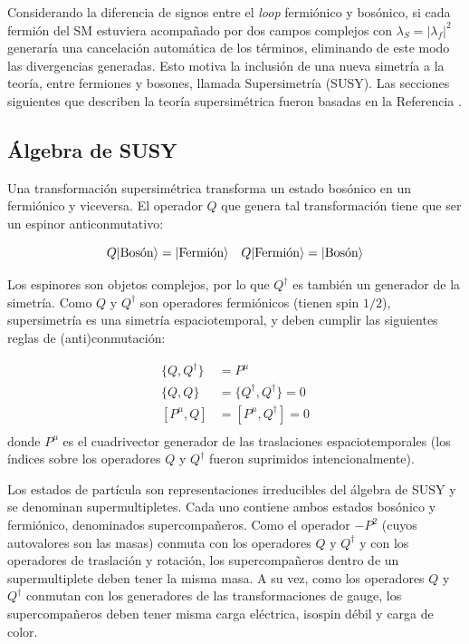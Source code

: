 Considerando la diferencia de signos entre el \textit{loop} fermiónico y bosónico, si cada fermión del SM estuviera acompañado por dos campos complejos con $\lambda_S = |\lambda_f|^2$ generaría una cancelación automática de los términos, eliminando de este modo las divergencias generadas. Esto motiva la inclusión de una nueva simetría a la teoría, entre fermiones y bosones, llamada Supersimetría (SUSY). Las secciones siguientes que describen la teoría supersimétrica fueron basadas en la Referencia \cite{martin}.

\subsection{Álgebra de SUSY}

Una transformación supersimétrica transforma un estado bosónico en un fermiónico y viceversa. El operador $Q$ que genera tal transformación tiene que ser un espinor anticonmutativo:

\begin{equation}
	Q\lvert\text{Bosón}\rangle = \lvert\text{Fermión}\rangle \quad Q\lvert\text{Fermión}\rangle = \lvert\text{Bosón}\rangle
\end{equation}

Los espinores son objetos complejos, por lo que $Q^{\dagger}$ es también un generador de la simetría. Como $Q$ y $Q^{\dagger}$ son operadores fermiónicos (tienen spin $1/2$), supersimetría es una simetría espaciotemporal, y deben cumplir las siguientes reglas de (anti)conmutación:

\begin{equation}
	\begin{split}	
		\{Q,Q^{\dagger}\} & = P^{\mu}\\
		\{Q,Q\} & = \{Q^{\dagger},Q^{\dagger}\} = 0\\
		[P^{\mu},Q] & = [P^{\mu},Q^{\dagger}] = 0\\
	\end{split}	
\end{equation}
%
donde $P^{\mu}$ es el cuadrivector generador de las traslaciones espaciotemporales (los índices sobre los operadores $Q$ y $Q^{\dagger}$ fueron suprimidos intencionalmente).


Los estados de partícula son representaciones irreducibles del álgebra de SUSY y se denominan supermultipletes. Cada uno contiene ambos estados bosónico y fermiónico, denominados supercompañeros. Como el operador $-P^2$ (cuyos autovalores son las masas) conmuta con los operadores $Q$ y $Q^{\dagger}$ y con los operadores de traslación y rotación, los supercompañeros dentro de un supermultiplete deben tener la misma masa. A su vez, como los operadores $Q$ y $Q^{\dagger}$ conmutan con los generadores de las transformaciones de gauge, los supercompañeros deben tener misma carga eléctrica, isospin débil y carga de color.

